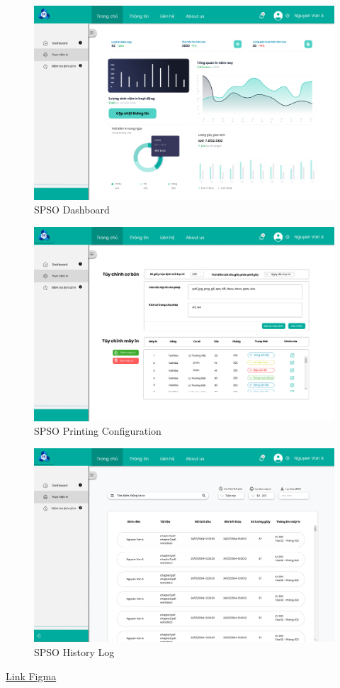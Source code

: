 \begin{figure}[H]
    \centering
    \includegraphics[width = \textwidth, ]{images/UI/Bảng điều khiển SPSO.png}
    \caption{SPSO Dashboard}
\end{figure}  

\begin{figure}[H]
    \centering
    \includegraphics[width = \textwidth, ]{images/UI/Thay đổi in SPSO.png}
    \caption{SPSO Printing Configuration}
\end{figure}  

\begin{figure}[H]
    \centering
    \includegraphics[width = \textwidth, ]{images/UI/Tra lịch sử SPSO.png}
    \caption{SPSO History Log}
\end{figure}  



\href{}{Link Figma}

\newpage